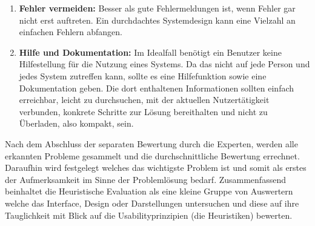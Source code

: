 \documentclass[draft=false
              ,paper=a4
              ,twoside=false
              ,fontsize=11pt
              ,headsepline
              ,BCOR10mm
              ,DIV11
              ]{scrbook}
\begin{document}
\begin{enumerate}
  \item \textbf{Fehler vermeiden:} Besser als gute Fehlermeldungen ist, wenn Fehler gar nicht erst auftreten. Ein durchdachtes Systemdesign kann eine Vielzahl an einfachen Fehlern abfangen.
  \item \textbf{Hilfe und Dokumentation:} Im Idealfall benötigt ein Benutzer keine Hilfestellung für die Nutzung eines Systems. Da das nicht auf jede Person und jedes System zutreffen kann, sollte es eine Hilfefunktion sowie eine Dokumentation geben. Die dort enthaltenen Informationen sollten einfach erreichbar, leicht zu durchsuchen, mit der aktuellen Nutzertätigkeit verbunden, konkrete Schritte zur Lösung bereithalten und nicht zu Überladen, also kompakt, sein.
\end{enumerate}

Nach dem Abschluss der separaten Bewertung durch die Experten, werden alle erkannten Probleme gesammelt und die durchschnittliche Bewertung errechnet. Daraufhin wird festgelegt welches das wichtigste Problem ist und somit als erstes der Aufmerksamkeit im Sinne der Problemlösung bedarf.
Zusammenfassend beinhaltet die Heuristische Evaluation als eine kleine Gruppe von Auswertern welche das Interface, Design oder Darstellungen untersuchen und diese auf ihre Tauglichkeit mit Blick auf die Usabilityprinzipien (die Heuristiken) bewerten.
\end{document}
